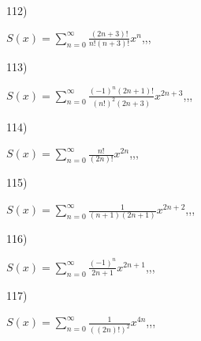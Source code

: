 \documentclass[11pt, ukrainian]{article}
\begin{document}
\par
\vspace{0.9cm}
112) \space 
{%
{$S(x)=\sum\limits_{n=0}^{\infty}{\frac{(2n+3)!}{n!(n+3)!}}{x^{n}}$},,, \par \smallskip  
}
\par
\vspace{0.9cm}
113) \space 
{%
{$S(x)=\sum\limits_{n=0}^{\infty}{\frac{{(-1)^n}(2n+1)!}{{(n!)^2}(2n+3)}}{x^{{2n+3}}}$},,, \par \smallskip  
}
\par
\vspace{0.9cm}
114) \space 
{%
{$S(x)=\sum\limits_{n=0}^{\infty}{\frac{n!}{(2n)!}}{x^{{2n}}}$},,, \par \smallskip  
}
\par
\vspace{0.9cm}
115) \space 
{%
{$S(x)=\sum\limits_{n=0}^{\infty}{\frac{1}{(n+1)(2n+1)}}{x^{{2n+2}}}$},,, \par \smallskip  
}
\par
\vspace{0.9cm}
116) \space 
{%
{$S(x)=\sum\limits_{n=0}^{\infty}{\frac{(-1)^{n}}{2n+1}}{x^{{2n+1}}}$},,, \par \smallskip  
}
\par
\vspace{0.9cm}
117) \space 
{%
{$S(x)=\sum\limits_{n=0}^{\infty}{\frac{1}{((2n)!)^2}}{x^{{4n}}}$},,, \par \smallskip  
}
\end{document}
